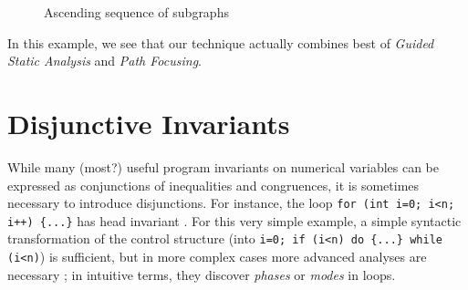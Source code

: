 \begin{figure}
\begin{minipage}[c]{.50\textwidth}
\end{minipage}\hfill
\begin{minipage}[c]{.50\textwidth}
\end{minipage}
\caption{Ascending sequence of subgraphs}
\label{fig:example-graph}
\end{figure}


In this example, we see that our technique actually combines best of
\emph{Guided Static Analysis} and \emph{Path Focusing}. 


\section{Disjunctive Invariants}
\label{sec:disjunctive}
While many (most?) useful program invariants on numerical variables can be expressed as conjunctions of inequalities and congruences, it is sometimes necessary to introduce disjunctions.
For instance, the loop \lstinline|for (int i=0; i<n; i++) {...}| has head invariant .
For this very simple example, a simple syntactic transformation of the control structure (into \lstinline|i=0; if (i<n) do {...} while (i<n)|) is sufficient, but in more complex cases more advanced analyses are necessary
\cite{DBLP:conf/emsoft/BalakrishnanSIG09,DBLP:journals/fmsd/Jeannet03,DBLP:conf/cav/SharmaDDA11,Monniaux_Bodin_APLAS11};
in intuitive terms, they discover \emph{phases} or \emph{modes} in loops.

